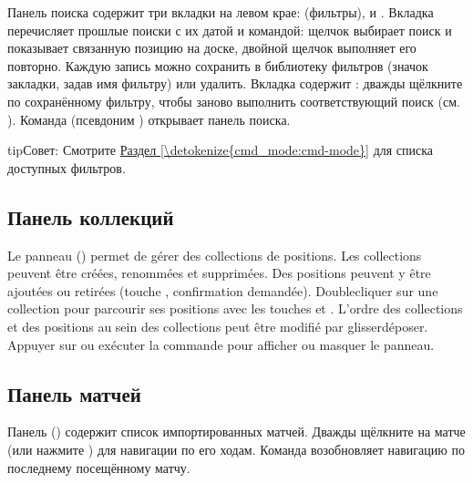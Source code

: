 \documentclass[letterpaper,10pt,russian]{sphinxmanual}
\begin{document}
\sphinxAtStartPar
Панель поиска содержит три вкладки на левом крае:  (фильтры),  и . Вкладка  перечисляет прошлые поиски с их датой и командой: щелчок выбирает поиск и показывает связанную позицию на доске, двойной щелчок выполняет его повторно. Каждую запись можно сохранить в библиотеку фильтров (значок закладки, задав имя фильтру) или удалить. Вкладка  содержит : дважды щёлкните по сохранённому фильтру, чтобы заново выполнить соответствующий поиск (см. {\hyperref[\detokenize{annexe_filtres:annexe-filtres}]{}}). Команда  (псевдоним ) открывает панель поиска.

\begin{sphinxadmonition}{tip}{Совет:}
\sphinxAtStartPar
Смотрите \hyperref[\detokenize{cmd_mode:cmd-mode}]{Раздел \ref{\detokenize{cmd_mode:cmd-mode}}} для списка доступных фильтров.
\end{sphinxadmonition}


\subsection{Панель коллекций}
\label{\detokenize{manuel:panneau-collections}}\label{\detokenize{manuel:id6}}
\sphinxAtStartPar
Le panneau  () permet de gérer des collections de
positions. Les collections peuvent être créées, renommées et supprimées. Des
positions peuvent y être ajoutées ou retirées (touche , confirmation
demandée). Double\sphinxhyphen{}cliquer sur une collection pour parcourir ses positions
avec les touches  et . L’ordre des collections et des
positions au sein des collections peut être modifié par glisser\sphinxhyphen{}déposer.
Appuyer sur  ou exécuter la commande  pour afficher ou
masquer le panneau.


\subsection{Панель матчей}
\label{\detokenize{manuel:panneau-matchs}}\label{\detokenize{manuel:id7}}
\sphinxAtStartPar
Панель  () содержит список импортированных матчей. Дважды щёлкните на матче (или нажмите ) для навигации по его ходам. Команда  возобновляет навигацию по последнему посещённому матчу.
\end{document}
